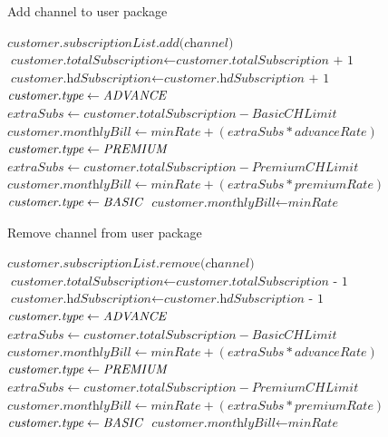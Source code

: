 \begin{spacing}{1}
	\begin{algorithm}
	\caption{Add channel to user package}\label{add}
	\begin{algorithmic}[1]
		\State $\textit{customer.subscriptionList.add(channel)}$
		\State $\textit{customer.totalSubscription} \gets \textit{customer.totalSubscription + 1} $
		\State $\textit{customer.hdSubscription} \gets \textit{customer.hdSubscription + 1}$
		\EndIf
		\State $\textit{customer.type} \gets \emph{ADVANCE}$
		\State $\textit{extraSubs} \gets \textit{customer.totalSubscription} - \textit{BasicCHLimit}$
		\State $\textit{customer.monthlyBill}  \gets \textit{minRate} + (\textit{extraSubs} * \textit{advanceRate})$
		\State $\textit{customer.type} \gets \emph{PREMIUM}$
		\State $\textit{extraSubs} \gets \textit{customer.totalSubscription} - \textit{PremiumCHLimit}$
		\State $\textit{customer.monthlyBill}  \gets \textit{minRate} + (\textit{extraSubs} * \textit{premiumRate})$
		\Else
		\State $\textit{customer.type} \gets \emph{BASIC}$
		\State $\textit{customer.monthlyBill}  \gets \textit{minRate}$
		\EndIf
		\EndProcedure
	\end{algorithmic}
\end{algorithm}
\begin{algorithm}
	\caption{Remove channel from user package}\label{remove}
	\begin{algorithmic}[H]
		\State $\textit{customer.subscriptionList.remove(channel)}$
		\State $\textit{customer.totalSubscription} \gets \textit{customer.totalSubscription - 1} $
		\State $\textit{customer.hdSubscription} \gets \textit{customer.hdSubscription - 1}$
		\EndIf
		\State $\textit{customer.type} \gets \emph{ADVANCE}$
		\State $\textit{extraSubs} \gets \textit{customer.totalSubscription} - \textit{BasicCHLimit}$
		\State $\textit{customer.monthlyBill}  \gets \textit{minRate} + (\textit{extraSubs} * \textit{advanceRate})$
		\State $\textit{customer.type} \gets \emph{PREMIUM}$
		\State $\textit{extraSubs} \gets \textit{customer.totalSubscription} - \textit{PremiumCHLimit}$
		\State $\textit{customer.monthlyBill}  \gets \textit{minRate} + (\textit{extraSubs} * \textit{premiumRate})$
		\Else
		\State $\textit{customer.type} \gets \emph{BASIC}$
		\State $\textit{customer.monthlyBill}  \gets \textit{minRate}$
		\EndIf
		\EndProcedure
	\end{algorithmic}
\end{algorithm}   


\end{spacing}
